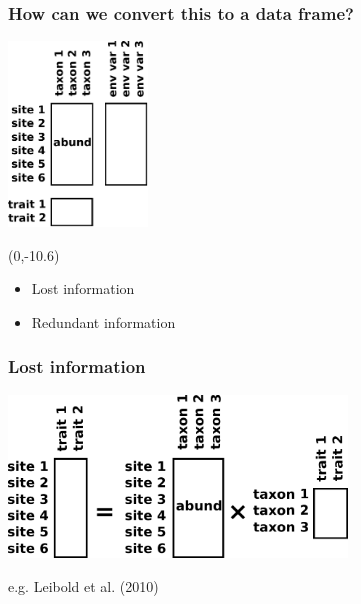\documentclass{beamer}
\numberwithin{exercise}{section}
\begin{document}
\begin{frame}
\frametitle{How can we convert this to a data frame?}
\begin{center}
\includegraphics[width=3.7cm]{forthcorner}
\pause
\begin{textblock}{4}(0,-10.6)
\begin{block}{}
\begin{itemize}
\item Lost information
\item Redundant information
\end{itemize}
\end{block}
\end{textblock}
\end{center}
\end{frame}

%

\begin{frame}
\frametitle{Lost information}
\begin{center}
\includegraphics[width=9cm]{forthcorner2dataframeSUMMARIZE1}
\end{center}
\footnotesize{e.g. Leibold et al. (2010)}
\end{frame}
\end{document}

